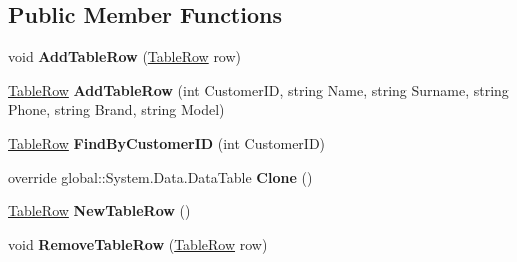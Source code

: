 \subsection*{Public Member Functions}
\begin{DoxyCompactItemize}
\item 
\mbox{\label{classprojekt__grupowy_1_1database_data_set_1_1_table_data_table_af79a435292b98fa67d521c72dc754732}} 
void {\bfseries Add\+Table\+Row} (\hyperlink{classprojekt__grupowy_1_1database_data_set_1_1_table_row}{Table\+Row} row)
\item 
\mbox{\label{classprojekt__grupowy_1_1database_data_set_1_1_table_data_table_ab62dde85c1f2c627f33ba437e23aff20}} 
\hyperlink{classprojekt__grupowy_1_1database_data_set_1_1_table_row}{Table\+Row} {\bfseries Add\+Table\+Row} (int Customer\+ID, string Name, string Surname, string Phone, string Brand, string Model)
\item 
\mbox{\label{classprojekt__grupowy_1_1database_data_set_1_1_table_data_table_a84163598254bef73cb1dc52d24f9484c}} 
\hyperlink{classprojekt__grupowy_1_1database_data_set_1_1_table_row}{Table\+Row} {\bfseries Find\+By\+Customer\+ID} (int Customer\+ID)
\item 
\mbox{\label{classprojekt__grupowy_1_1database_data_set_1_1_table_data_table_abd4bc44ad20793e5c391166804dd4e69}} 
override global\+::\+System.\+Data.\+Data\+Table {\bfseries Clone} ()
\item 
\mbox{\label{classprojekt__grupowy_1_1database_data_set_1_1_table_data_table_a6b1c8e429b95327f491a5e2dc4ab8e80}} 
\hyperlink{classprojekt__grupowy_1_1database_data_set_1_1_table_row}{Table\+Row} {\bfseries New\+Table\+Row} ()
\item 
\mbox{\label{classprojekt__grupowy_1_1database_data_set_1_1_table_data_table_aa57bf8c250286527bab038551fcffec8}} 
void {\bfseries Remove\+Table\+Row} (\hyperlink{classprojekt__grupowy_1_1database_data_set_1_1_table_row}{Table\+Row} row)
\end{DoxyCompactItemize}
